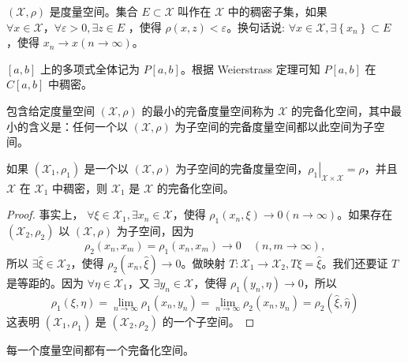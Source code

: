 \documentclass[lang=cn,newtx,10pt,scheme=chinese,thmcnt=chapter]{elegantbook}
\begin{document}
\begin{definition}
 \( (\mathscr{X}, \rho) \) 是度量空间。集合 \( E \subset \mathscr{X} \) 叫作在 \( \mathscr{X} \) 中的稠密子集，如果 \( \forall x \in \mathscr{X} ， \forall \varepsilon>0, \exists z \in E \) ，使得 \( \rho(x, z)<\varepsilon \)。换句话说: \( \forall x \in \mathscr{X} , \exists\left\{x_n\right\} \subset E \) ，使得 \( x_n \rightarrow x(n \rightarrow \infty) \)。
\end{definition}

\begin{example}
 \([a, b]\) 上的多项式全体记为 \( P[a, b] \)。根据 Weierstrass 定理可知 \( P[a, b] \) 在 \( C[a, b] \) 中稠密。
\end{example}

\begin{definition}
包含给定度量空间 \( (\mathscr{X}, \rho) \) 的最小的完备度量空间称为 \( \mathscr{X} \) 的完备化空间，其中最小的含义是：任何一个以 \( (\mathscr{X}, \rho) \) 为子空间的完备度量空间都以此空间为子空间。
\end{definition}
\begin{proposition}
如果 \( \left( \mathscr{X}_1, \rho_1 \right) \) 是一个以 \( (\mathscr{X}, \rho) \) 为子空间的完备度量空间，\( \left. \rho_1 \right|_{ \mathscr{X} \times \mathscr{X} } = \rho \)，并且 \( \mathscr{X} \) 在 \( \mathscr{X}_1 \) 中稠密，则 \( \mathscr{X}_1 \) 是 \( \mathscr{X} \) 的完备化空间。
\end{proposition}
\begin{proof}
     事实上， \( \forall \xi \in \mathscr{X}_1, \exists x_n \in \mathscr{X} \)，使得 \( \rho_1\left(x_n, \xi\right) \rightarrow 0(n \rightarrow \infty) \)。如果存在 \( \left( \mathscr{X}_2, \rho_2 \right) \) 以 \( (\mathscr{X}, \rho) \) 为子空间，因为
\begin{equation*}
\rho_2\left(x_n, x_m\right) = \rho_1\left(x_n, x_m\right) \rightarrow 0 \quad (n, m \rightarrow \infty),
\end{equation*}
所以 \( \exists \widehat{\xi} \in \mathscr{X}_2 \)，使得 \( \rho_2\left(x_n, \widehat{\xi}\right) \rightarrow 0 \)。做映射 \( T: \mathscr{X}_1 \rightarrow \mathscr{X}_2, T \xi = \widehat{\xi} \)。我们还要证 \( T \) 是等距的。因为 \( \forall \eta \in \mathscr{X}_1 \)，又 \( \exists y_n \in \mathscr{X} \)，使得 \( \rho_1\left(y_n, \eta\right) \rightarrow 0 \)，所以
\begin{equation*}
\rho_1(\xi, \eta) = \lim_{n \rightarrow \infty} \rho_1\left(x_n, y_n\right) = \lim_{n \rightarrow \infty} \rho_2\left(x_n, y_n\right) = \rho_2(\widehat{\xi}, \widehat{\eta})
\end{equation*}
这表明 \( \left( \mathscr{X}_1, \rho_1 \right) \) 是 \( \left( \mathscr{X}_2, \rho_2 \right) \) 的一个子空间。
\end{proof}
\begin{theorem}
每一个度量空间都有一个完备化空间。
\end{theorem}
\end{document}
